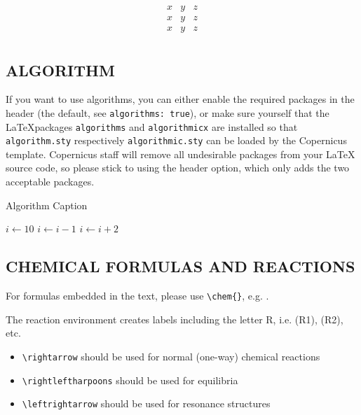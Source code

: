 \documentclass[, manuscript]{copernicus}
\begin{document}
\[
\begin{matrix}
x & y & z\\
x & y & z\\
x & y & z\\
\end{matrix}
\]

\subsection{ALGORITHM}

If you want to use algorithms, you can either enable the required
packages in the header (the default, see \texttt{algorithms:\ true}), or
make sure yourself that the \LaTeX packages \texttt{algorithms} and
\texttt{algorithmicx} are installed so that \texttt{algorithm.sty}
respectively \texttt{algorithmic.sty} can be loaded by the Copernicus
template. Copernicus staff will remove all undesirable packages from
your LaTeX source code, so please stick to using the header option,
which only adds the two acceptable packages.

\begin{algorithm}
\caption{Algorithm Caption}
\label{a1}
\begin{algorithmic}
\STATE $i\gets 10$
        \STATE $i\gets i-1$
\ELSE
                \STATE $i\gets i+2$
        \ENDIF
\ENDIF
\end{algorithmic}
\end{algorithm}

\subsection{CHEMICAL FORMULAS AND REACTIONS}

For formulas embedded in the text, please use
\texttt{\textbackslash{}chem\{\}}, e.g. .

The reaction environment creates labels including the letter R, i.e.
(R1), (R2), etc.

\begin{itemize}
\item
  \texttt{\textbackslash{}rightarrow} should be used for normal
  (one-way) chemical reactions
\item
  \texttt{\textbackslash{}rightleftharpoons} should be used for
  equilibria
\item
  \texttt{\textbackslash{}leftrightarrow} should be used for resonance
  structures
\end{itemize}
\end{document}
